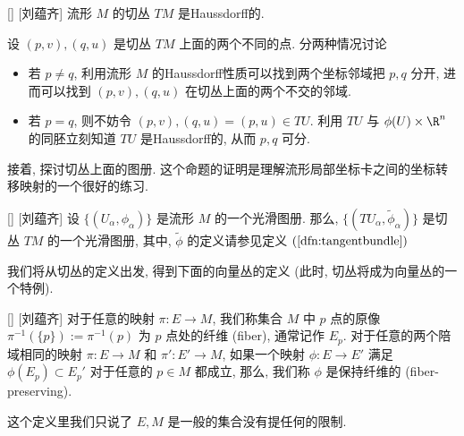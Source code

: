\documentclass[UTF8]{ctexart}
\begin{document}
        \begin{ppt}
            []
            {}
            []
            [刘蕴齐]
            流形 \(M\) 的切丛 \(TM\) 是Haussdorff的. 
        \end{ppt}

        \begin{prf}
            设 \((p,v), (q,u)\) 是切丛 \(TM\) 上面的两个不同的点. 分两种情况讨论
            \begin{itemize}
                \item 若 \(p \neq q\), 利用流形 \(M\) 的Haussdorff性质可以找到两个坐标邻域把 \(p,q\) 分开, 进而可以找到 \((p,v), (q,u)\) 在切丛上面的两个不交的邻域. 
                \item 若 \(p = q\), 则不妨令 \((p,v), (q,u)=(p,u) \in TU\). 利用 \(TU\) 与 \(\phi(U) \times \R^n\) 的同胚立刻知道 \(TU\) 是Haussdorff的, 从而 \(p, q\) 可分. 
            \end{itemize}
        \end{prf}

        接着, 探讨切丛上面的图册. 这个命题的证明是理解流形局部坐标卡之间的坐标转移映射的一个很好的练习. 

        \begin{ppt}
            []
            {}
            []
            [刘蕴齐]
            设 \(\{(U_{\alpha}, \phi_{\alpha})\}\) 是流形 \(M\) 的一个光滑图册. 那么,  \(\{(T U_{\alpha}, \tilde{\phi}_{\alpha})\}\) 是切丛 \(TM\) 的一个光滑图册, 其中,  \(\tilde{\phi}\) 的定义请参见定义 \((\ref{dfn:tangentbundle})\) 
        \end{ppt}

        我们将从切丛的定义出发, 得到下面的向量丛的定义 (此时, 切丛将成为向量丛的一个特例). 

        \begin{dfn}
            []
            {}
            []
            [刘蕴齐]
            对于任意的映射 \(\pi: E \to M\), 我们称集合 \(M\) 中 \(p\) 点的原像 \(\pi^{-1} (\{p\}):= \pi^{-1}(p)\) 为 \(p\) 点处的纤维 (fiber), 通常记作 \(E_p\). 对于任意的两个陪域相同的映射 \(\pi: E \to M\) 和 \(\pi': E' \to M\), 如果一个映射 \(\phi: E \to E'\) 满足 \(\phi(E_p) \subset E_p '\) 对于任意的 \(p \in M\) 都成立, 那么, 我们称 \(\phi\) 是保持纤维的 (fiber-preserving). 
        \end{dfn}

        \begin{rmk}
            []
            这个定义里我们只说了 \(E, M\) 是一般的集合没有提任何的限制. 
        \end{rmk}
\end{document}
